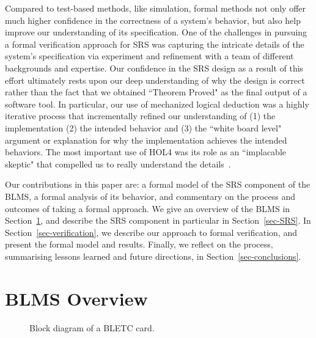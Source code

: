 \documentclass{llncs}
\begin{document}
Compared to test-based methods, like simulation, formal methods not only offer much higher confidence in the correctness of a system's behavior, but also help improve our understanding of its specification.
One of the challenges in pursuing a formal verification approach for SRS was capturing the intricate details of the system's specification via experiment and refinement with a team of different backgrounds and expertise.
Our confidence in the SRS design as a result of this effort ultimately rests upon our deep understanding of why the design is correct rather than the fact that we obtained ``Theorem Proved" as the final output of a software tool.
In particular, our use of mechanized logical deduction was a highly iterative process that incrementally refined our understanding of (1) the implementation (2) the intended behavior and (3) the ``white board level" argument or explanation for why the implementation achieves the intended behaviors.
The most important use of HOL4  was its role as an ``implacable skeptic" that compelled us to really understand the details~\cite{rushby}.

Our contributions in this paper are: a formal model of the SRS component of the BLMS, a formal analysis of its behavior, and commentary on the process and outcomes of taking a formal approach.
We give an overview of the BLMS in Section~\ref{sec-BLM}, and describe the SRS component in particular in Section~\ref{sec-SRS}.
In Section~\ref{sec-verification}, we describe our approach to formal verification, and present the formal model and results.
Finally, we reflect on the process, summarising lessons learned and future directions, in Section~\ref{sec-conclusions}.

\section{BLMS Overview}
\label{sec-BLM}

\begin{figure}[t]
  \centering  {}
   \caption{Block diagram of a BLETC card.}
  \label{fig:BLETC}
\end{figure}
\end{document}
